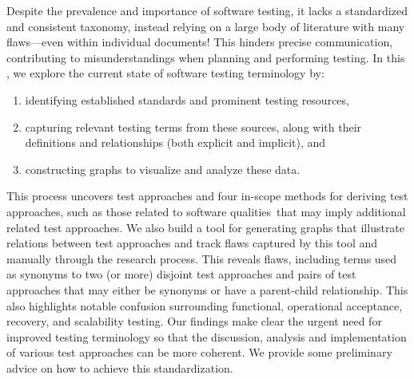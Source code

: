 \label{abstract}%
Despite the prevalence and importance of software testing, it lacks
a standardized and consistent taxonomy, instead relying on a large body of
literature with many flaws---even within individual documents! This hinders
precise communication, contributing to misunderstandings when planning and
performing testing. In this \docType{}, we %
explore the current state of software testing terminology by:
\begin{enumerate}
    \item identifying established standards and prominent testing resources,
    \item capturing relevant testing terms from these sources, along with their
          definitions and relationships (both explicit and implicit), and
    \item constructing graphs to visualize and analyze these data.
\end{enumerate}
This process uncovers \approachCount{} test approaches and
\ifnotpaper four in-scope methods for deriving test approaches, such as those
    related to \fi \qualityCount{} software qualities\ifnotpaper\else\ that may
    imply additional related test approaches\fi. We also build
a tool for generating graphs that illustrate relations between test
approaches and track flaws captured by this tool and manually through
the research process. This reveals \flawCount{} flaws, including
\multiSynCount{} terms used as synonyms to two (or more) disjoint test approaches
and \parSynCount{} pairs of test approaches that may either be synonyms or have
a parent-child relationship. This also highlights notable confusion surrounding
functional, operational acceptance, recovery, and scalability testing. Our
findings make clear the urgent need for improved testing terminology so that
the discussion, analysis and implementation of various test approaches can be
more coherent. We provide some preliminary advice on how to achieve this
standardization.